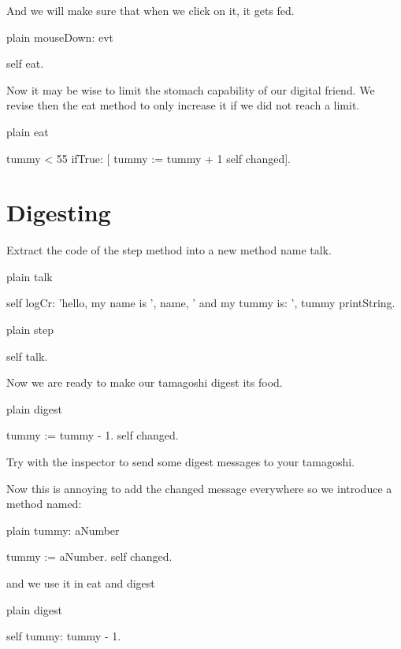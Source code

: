 \documentclass[10pt,twoside,english]{_support/latex/sbabook/sbabook}
\begin{document}
And we will make sure that when we click on it, it gets fed.

\begin{displaycode}{plain}
mouseDown: evt
	
	self eat.	
\end{displaycode}

Now it may be wise to limit the stomach capability of our digital friend. We revise then the eat method to only increase it if we did not reach a limit. 

\begin{displaycode}{plain}
eat 

	tummy < 55
		ifTrue: [ tummy := tummy + 1
				  self changed]. 
\end{displaycode}
\section{Digesting}
Extract the code of the step method into a new method name talk.

\begin{displaycode}{plain}
talk

	self logCr: 'hello, my name is ', name, ' and my tummy is: ', tummy printString.
\end{displaycode}

\begin{displaycode}{plain}
step

	self talk.
\end{displaycode}

Now we are ready to make our tamagoshi digest its food. 

\begin{displaycode}{plain}
digest

	tummy := tummy - 1.
	self changed.
\end{displaycode}

Try with the inspector to send some digest messages to your tamagoshi. 

Now this is annoying to add the changed message everywhere so we introduce a method named: 

\begin{displaycode}{plain}
tummy: aNumber

	tummy := aNumber.
	self changed.
\end{displaycode}

and we use it in eat and digest

\begin{displaycode}{plain}
digest

	self tummy: tummy - 1.
\end{displaycode}
\end{document}
